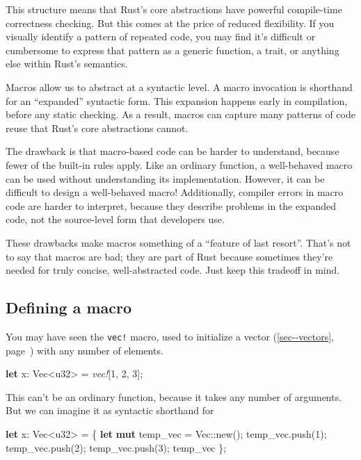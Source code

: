 \documentclass[a4paper,]{book}
\renewcommand*{\hyperref}[2][\ar]{%
  \def\ar{#2}%
  #2 (\autoref{#1}, page~\pageref{#1})}
\newenvironment{Shaded}{\begin{snugshade}}{\end{snugshade}}
\newcommand{\KeywordTok}[1]{\textcolor[rgb]{0.13,0.29,0.53}{\textbf{{#1}}}}
\newcommand{\DataTypeTok}[1]{\textcolor[rgb]{0.13,0.29,0.53}{{#1}}}
\newcommand{\DecValTok}[1]{\textcolor[rgb]{0.00,0.00,0.81}{{#1}}}
\newcommand{\PreprocessorTok}[1]{\textcolor[rgb]{0.56,0.35,0.01}{\textit{{#1}}}}
\newcommand{\NormalTok}[1]{{#1}}
\begin{document}
This structure means that Rust's core abstractions have powerful
compile-time correctness checking. But this comes at the price of
reduced flexibility. If you visually identify a pattern of repeated
code, you may find it's difficult or cumbersome to express that pattern
as a generic function, a trait, or anything else within Rust's
semantics.

Macros allow us to abstract at a syntactic level. A macro invocation is
shorthand for an ``expanded'' syntactic form. This expansion happens
early in compilation, before any static checking. As a result, macros
can capture many patterns of code reuse that Rust's core abstractions
cannot.

The drawback is that macro-based code can be harder to understand,
because fewer of the built-in rules apply. Like an ordinary function, a
well-behaved macro can be used without understanding its implementation.
However, it can be difficult to design a well-behaved macro!
Additionally, compiler errors in macro code are harder to interpret,
because they describe problems in the expanded code, not the
source-level form that developers use.

These drawbacks make macros something of a ``feature of last resort''.
That's not to say that macros are bad; they are part of Rust because
sometimes they're needed for truly concise, well-abstracted code. Just
keep this tradeoff in mind.

\subsection{Defining a macro}\label{defining-a-macro}

You may have seen the \texttt{vec!} macro, used to initialize a
\hyperref[sec--vectors]{vector} with any number of elements.

\begin{Shaded}
\begin{Highlighting}[]
\KeywordTok{let} \NormalTok{x: }\DataTypeTok{Vec}\NormalTok{<}\DataTypeTok{u32}\NormalTok{> = }\PreprocessorTok{vec!}\NormalTok{[}\DecValTok{1}\NormalTok{, }\DecValTok{2}\NormalTok{, }\DecValTok{3}\NormalTok{];}
\end{Highlighting}
\end{Shaded}

This can't be an ordinary function, because it takes any number of
arguments. But we can imagine it as syntactic shorthand for

\begin{Shaded}
\begin{Highlighting}[]
\KeywordTok{let} \NormalTok{x: }\DataTypeTok{Vec}\NormalTok{<}\DataTypeTok{u32}\NormalTok{> = \{}
    \KeywordTok{let} \KeywordTok{mut} \NormalTok{temp_vec = }\DataTypeTok{Vec}\NormalTok{::new();}
    \NormalTok{temp_vec.push(}\DecValTok{1}\NormalTok{);}
    \NormalTok{temp_vec.push(}\DecValTok{2}\NormalTok{);}
    \NormalTok{temp_vec.push(}\DecValTok{3}\NormalTok{);}
    \NormalTok{temp_vec}
\NormalTok{\};}
\end{Highlighting}
\end{Shaded}
\end{document}
